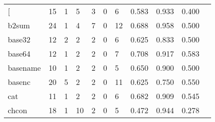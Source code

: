 \begin{longtable}{lp{1.10cm}p{1.10cm}p{1.10cm}p{1.10cm}p{1.10cm}p{1.10cm}p{1.10cm}p{1.10cm}p{1.10cm}p{1.10cm}}
\bottomrule
\endlastfoot
{[}         &                     15 &                                  1 &                                 5 &                                3 &                                 0 &                               6 &                          0.583 &                                 0.933 &                               0.400 \\
b2sum     &                     24 &                                  1 &                                 4 &                                7 &                                 0 &                              12 &                          0.688 &                                 0.958 &                               0.500 \\
base32    &                     12 &                                  2 &                                 2 &                                2 &                                 0 &                               6 &                          0.625 &                                 0.833 &                               0.500 \\
base64    &                     12 &                                  1 &                                 2 &                                2 &                                 0 &                               7 &                          0.708 &                                 0.917 &                               0.583 \\
basename  &                     10 &                                  1 &                                 2 &                                2 &                                 0 &                               5 &                          0.650 &                                 0.900 &                               0.500 \\
basenc    &                     20 &                                  5 &                                 2 &                                2 &                                 0 &                              11 &                          0.625 &                                 0.750 &                               0.550 \\
cat       &                     11 &                                  1 &                                 2 &                                2 &                                 0 &                               6 &                          0.682 &                                 0.909 &                               0.545 \\
chcon     &                     18 &                                  1 &                                10 &                                2 &                                 0 &                               5 &                          0.472 &                                 0.944 &                               0.278 \\

\end{longtable}
